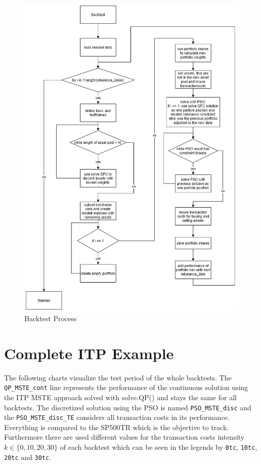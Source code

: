 \documentclass[
  oneside]{book}
\begin{document}
\begin{figure}
\centering
\includegraphics{img/Chapter9_PSO_Process4.jpg}
\caption{Backtest Process}
\end{figure}

\hypertarget{complete-itp-example}{%
\section{Complete ITP Example}\label{complete-itp-example}}

The following charts visualize the test period of the whole backtests. The \texttt{QP\_MSTE\_cont} line represents the performance of the continuous solution using the ITP MSTE approach solved with solve.QP() and stays the same for all backtests. The discretized solution using the PSO is named \texttt{PSO\_MSTE\_disc} and the \texttt{PSO\_MSTE\_disc\_TE} considers all transaction costs in its performance. Everything is compared to the SP500TR which is the objective to track. Furthermore there are used different values for the transaction costs intensity \(k \in \{0, 10, 20, 30\}\) of each backtest which can be seen in the legends by \texttt{0tc}, \texttt{10tc}, \texttt{20tc} and \texttt{30tc}.
\end{document}
